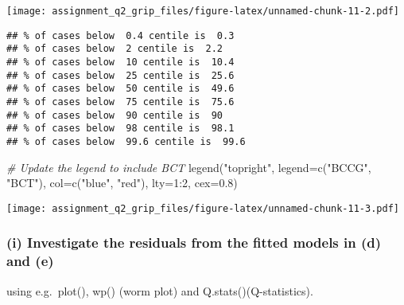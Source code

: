 \documentclass[
]{article}
\newenvironment{Shaded}{\begin{snugshade}}{\end{snugshade}}
\newcommand{\AttributeTok}[1]{\textcolor[rgb]{0.77,0.63,0.00}{#1}}
\newcommand{\CommentTok}[1]{\textcolor[rgb]{0.56,0.35,0.01}{\textit{#1}}}
\newcommand{\DecValTok}[1]{\textcolor[rgb]{0.00,0.00,0.81}{#1}}
\newcommand{\FloatTok}[1]{\textcolor[rgb]{0.00,0.00,0.81}{#1}}
\newcommand{\FunctionTok}[1]{\textcolor[rgb]{0.00,0.00,0.00}{#1}}
\newcommand{\NormalTok}[1]{#1}
\newcommand{\SpecialCharTok}[1]{\textcolor[rgb]{0.00,0.00,0.00}{#1}}
\newcommand{\StringTok}[1]{\textcolor[rgb]{0.31,0.60,0.02}{#1}}
\begin{document}
\texttt{[image: assignment\_q2\_grip\_files/figure-latex/unnamed-chunk-11-2.pdf]}

\begin{Shaded}
\end{Shaded}

\begin{verbatim}
## % of cases below  0.4 centile is  0.3 
## % of cases below  2 centile is  2.2 
## % of cases below  10 centile is  10.4 
## % of cases below  25 centile is  25.6 
## % of cases below  50 centile is  49.6 
## % of cases below  75 centile is  75.6 
## % of cases below  90 centile is  90 
## % of cases below  98 centile is  98.1 
## % of cases below  99.6 centile is  99.6
\end{verbatim}

\begin{Shaded}
\begin{Highlighting}[]
\CommentTok{\# Update the legend to include BCT}
\FunctionTok{legend}\NormalTok{(}\StringTok{"topright"}\NormalTok{, }\AttributeTok{legend=}\FunctionTok{c}\NormalTok{(}\StringTok{"BCCG"}\NormalTok{, }\StringTok{"BCT"}\NormalTok{), }\AttributeTok{col=}\FunctionTok{c}\NormalTok{(}\StringTok{"blue"}\NormalTok{, }\StringTok{"red"}\NormalTok{), }\AttributeTok{lty=}\DecValTok{1}\SpecialCharTok{:}\DecValTok{2}\NormalTok{, }\AttributeTok{cex=}\FloatTok{0.8}\NormalTok{)}
\end{Highlighting}
\end{Shaded}

\texttt{[image: assignment\_q2\_grip\_files/figure-latex/unnamed-chunk-11-3.pdf]}

\hypertarget{i-investigate-the-residuals-from-the-fitted-models-in-d-and-e}{%
\subsubsection{(i) Investigate the residuals from the fitted models in
(d) and
(e)}\label{i-investigate-the-residuals-from-the-fitted-models-in-d-and-e}}

using e.g.~plot(), wp() (worm plot) and Q.stats()(Q-statistics).
\end{document}
